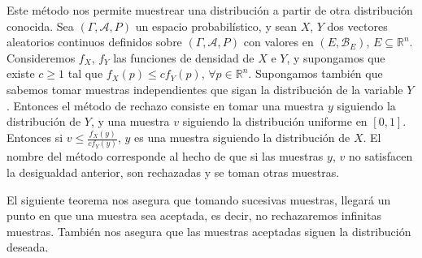 Este método nos permite muestrear una distribución a partir de otra distribución conocida. Sea $(\Gamma,\mathcal{A}, P)$ un espacio probabilístico, y sean $X$, $Y$ dos vectores aleatorios continuos definidos sobre $(\Gamma,\mathcal{A}, P)$ con valores en $(E,\mathscr{B}_E)$, $E\subseteq \mathds{R}^n$. Consideremos $f_X$, $f_Y$ las funciones de densidad de $X$ e $Y$, y supongamos que existe $c\geq 1$ tal que $f_X(p)\leq c f_Y(p)$, $\forall p\in\mathds{R}^n$. Supongamos también que sabemos tomar muestras independientes que sigan la distribución de la variable $Y$. Entonces el método de rechazo consiste en tomar una muestra $y$ siguiendo la distribución de $Y$, y una muestra $v$ siguiendo la distribución uniforme en $[0,1]$. Entonces si $v\leq \frac{f_X(y)}{cf_Y(y)}$, $y$ es una muestra siguiendo la distribución de $X$. El nombre del método corresponde al hecho de que si las muestras $y$, $v$ no satisfacen la desigualdad anterior, son rechazadas y se toman otras muestras.

El siguiente teorema nos asegura que tomando sucesivas muestras, llegará un punto en que una muestra sea aceptada, es decir, no rechazaremos infinitas muestras. También nos asegura que las muestras aceptadas siguen la distribución deseada.

